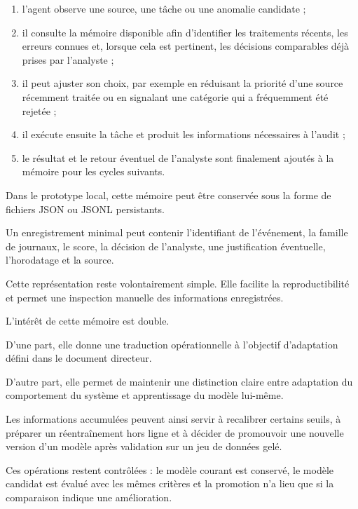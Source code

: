 \begin{enumerate}

\item l'agent observe une source, une tâche ou une anomalie candidate ;

\item il consulte la mémoire disponible afin d'identifier les traitements récents, les erreurs connues et, lorsque cela est pertinent, les décisions comparables déjà prises par l'analyste ;

\item il peut ajuster son choix, par exemple en réduisant la priorité d'une source récemment traitée ou en signalant une catégorie qui a fréquemment été rejetée ;

\item il exécute ensuite la tâche et produit les informations nécessaires à l'audit ;

\item le résultat et le retour éventuel de l'analyste sont finalement ajoutés à la mémoire pour les cycles suivants.

\end{enumerate}

Dans le prototype local, cette mémoire peut être conservée sous la forme de fichiers JSON ou JSONL persistants.

Un enregistrement minimal peut contenir l'identifiant de l'événement, la famille de journaux, le score, la décision de l'analyste, une justification éventuelle, l'horodatage et la source.

Cette représentation reste volontairement simple. Elle facilite la reproductibilité et permet une inspection manuelle des informations enregistrées.

L'intérêt de cette mémoire est double.

D'une part, elle donne une traduction opérationnelle à l'objectif d'adaptation défini dans le document directeur.

D'autre part, elle permet de maintenir une distinction claire entre adaptation du comportement du système et apprentissage du modèle lui-même.

Les informations accumulées peuvent ainsi servir à recalibrer certains seuils, à préparer un réentraînement hors ligne et à décider de promouvoir une nouvelle version d'un modèle après validation sur un jeu de données gelé.

Ces opérations restent contrôlées : le modèle courant est conservé, le modèle candidat est évalué avec les mêmes critères et la promotion n'a lieu que si la comparaison indique une amélioration.

